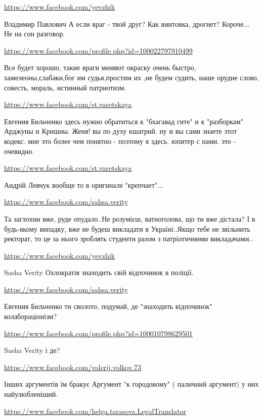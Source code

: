 \documentclass[a4paper,11pt]{extreport}
\begin{document}
\begin{itemize}
\begin{itemize}
\url{https://www.facebook.com/yevzhik}

Владимир Павлович А если враг - твой друг? Как винтовка, дрогнет? Короче... Не на сон разговор.

\url{https://www.facebook.com/profile.php?id=100022797910499}

Все будет хорошо, такие враги меняют окраску очень быстро, хамелеоны,слабаки,бог им судья,простим их ,не будем судить, наше орудие слово, совесть, мораль, истинный патриотизм.

\url{https://www.facebook.com/st.varetskaya}

Евгения Бильченко здесь нужно обратиться к "бхагавад гите" и к "разборкам" Арджуны и Кришны.
Женя! вы по духу кшатрий. ну и вы сами знаете этот кодекс.
мне это более чем понятно - поэтому я здесь.
юпитер с нами. это - очевидно.

\url{https://www.facebook.com/st.varetskaya}

Андрій Левчук вообще то в оригинале "крепчает"...

\end{itemize}
\url{https://www.facebook.com/sahsa.verity}

Та заглохни вже, руде опудало..Не розумієш, ватноголова, що ти вже дістала? І в будь-якому випадку, вже не будеш викладати в Україні..Якщо тебе не звільнить ректорат, то це за нього зроблять студенти разом з патріотичними викладачами..

\begin{itemize}
\url{https://www.facebook.com/yevzhik}

Sasha Verity Охлократія знаходить свій відпочинок в поліції.

\url{https://www.facebook.com/sahsa.verity}

Евгения Бильченко ти сволото, подумай, де "знаходить відпочинок" колабораціонізм?

\url{https://www.facebook.com/profile.php?id=100010798629501}

Sasha Verity і де?

\url{https://www.facebook.com/valerij.volkov.73}

Інших аргументів їм бракує
Аргумент "к городовому" ( паличний аргумент) у них найулюбленіший.

\url{https://www.facebook.com/helga.tarasova.LegalTranslator}


\end{itemize}
\end{itemize}
\end{document}
